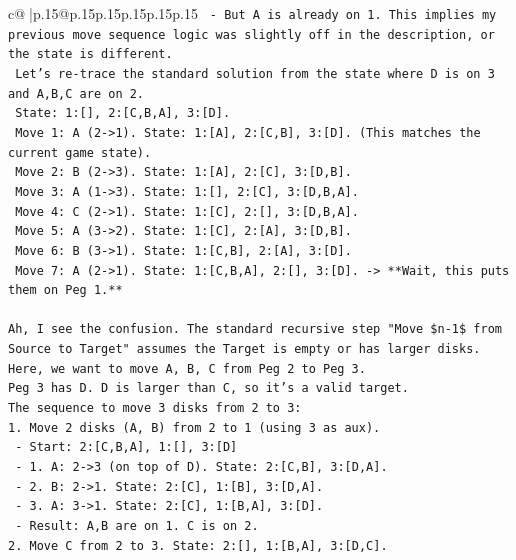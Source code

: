 \documentclass{article}
\begin{document}
{\begin{supertabular}{c@{$\;$}|p{.15\linewidth}@{}p{.15\linewidth}p{.15\linewidth}p{.15\linewidth}p{.15\linewidth}p{.15\linewidth}}
{{{\texttt{   {-} But A is already on 1. This implies my previous move sequence logic was slightly off in the description, or the state is different.} \\
\texttt{   Let's re{-}trace the standard solution from the state where D is on 3 and A,B,C are on 2.} \\
\texttt{   State: 1:{[}{]}, 2:{[}C,B,A{]}, 3:{[}D{]}.} \\
\texttt{   Move 1: A (2{-}>1). State: 1:{[}A{]}, 2:{[}C,B{]}, 3:{[}D{]}. (This matches the current game state).} \\
\texttt{   Move 2: B (2{-}>3). State: 1:{[}A{]}, 2:{[}C{]}, 3:{[}D,B{]}.} \\
\texttt{   Move 3: A (1{-}>3). State: 1:{[}{]}, 2:{[}C{]}, 3:{[}D,B,A{]}.} \\
\texttt{   Move 4: C (2{-}>1). State: 1:{[}C{]}, 2:{[}{]}, 3:{[}D,B,A{]}.} \\
\texttt{   Move 5: A (3{-}>2). State: 1:{[}C{]}, 2:{[}A{]}, 3:{[}D,B{]}.} \\
\texttt{   Move 6: B (3{-}>1). State: 1:{[}C,B{]}, 2:{[}A{]}, 3:{[}D{]}.} \\
\texttt{   Move 7: A (2{-}>1). State: 1:{[}C,B,A{]}, 2:{[}{]}, 3:{[}D{]}. {-}> **Wait, this puts them on Peg 1.**} \\
\\ 
\texttt{Ah, I see the confusion. The standard recursive step "Move \$n{-}1\$ from Source to Target" assumes the Target is empty or has larger disks.} \\
\texttt{Here, we want to move A, B, C from Peg 2 to Peg 3.} \\
\texttt{Peg 3 has D. D is larger than C, so it's a valid target.} \\
\texttt{The sequence to move 3 disks from 2 to 3:} \\
\texttt{1. Move 2 disks (A, B) from 2 to 1 (using 3 as aux).} \\
\texttt{   {-} Start: 2:{[}C,B,A{]}, 1:{[}{]}, 3:{[}D{]}} \\
\texttt{   {-} 1. A: 2{-}>3 (on top of D). State: 2:{[}C,B{]}, 3:{[}D,A{]}.} \\
\texttt{   {-} 2. B: 2{-}>1. State: 2:{[}C{]}, 1:{[}B{]}, 3:{[}D,A{]}.} \\
\texttt{   {-} 3. A: 3{-}>1. State: 2:{[}C{]}, 1:{[}B,A{]}, 3:{[}D{]}.} \\
\texttt{   {-} Result: A,B are on 1. C is on 2.} \\
\texttt{2. Move C from 2 to 3. State: 2:{[}{]}, 1:{[}B,A{]}, 3:{[}D,C{]}.} \\
}}}
\end{supertabular}}
\end{document}
